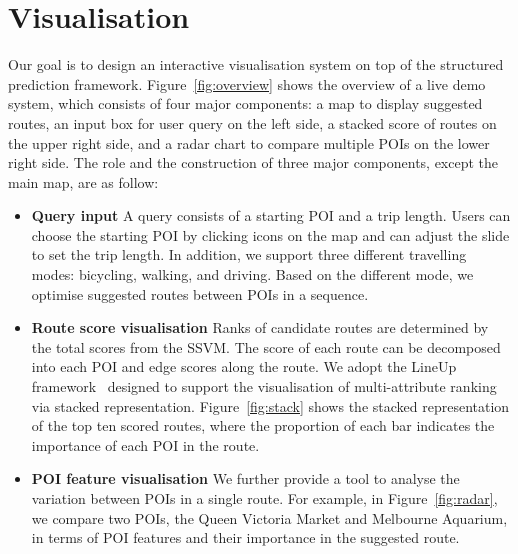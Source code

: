 \documentclass[sigconf]{acmart}
\begin{document}
\section{Visualisation}
Our goal is to design an interactive visualisation system on top of the structured prediction framework.
Figure~\ref{fig:overview} shows the overview of a live demo system, which consists of four major components: a map to display suggested routes, an input box for user query on the left side, a stacked score of routes on the upper right side, and a radar chart to compare multiple POIs on the lower right side. 
The role and the construction of three major components, except the main map, are as follow:
\begin{itemize}
\item \textbf{Query input} A query consists of a starting POI and a trip length. 
Users can choose the starting POI by clicking icons on the map and can adjust the slide to set the trip length. 
In addition, we support three different travelling modes: bicycling, walking, and driving.
Based on the different mode, we optimise suggested routes between POIs in a sequence.
\item \textbf{Route score visualisation} Ranks of candidate routes are determined by the total scores from the SSVM. 
The score of each route can be decomposed into each POI and edge scores along the route. 
We adopt the LineUp framework~\cite{gratzl2013lineup} designed to support the visualisation of multi-attribute ranking via stacked representation. 
Figure~\ref{fig:stack} shows the stacked representation of the top ten scored routes, where the proportion of each bar indicates the importance of each POI in the route.
\item \textbf{POI feature visualisation} We further provide a tool to analyse the variation between POIs in a single route. 
For example, in Figure~\ref{fig:radar}, we compare two POIs, the Queen Victoria Market and Melbourne Aquarium, in terms of POI features and their importance in the suggested route. 
\end{itemize}
\end{document}

